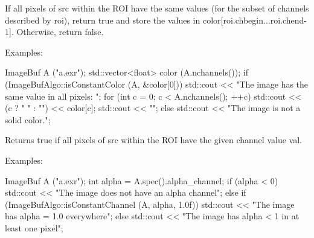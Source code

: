 \begin{comment}
 compare_Yee is a bit half-baked. Leave it out of the
  docs for now.  FIXME

\apiitem{int {\ce compare_Yee} (const ImageBuf \&A, const ImageBuf \&B, \\
  \bigspc CompareResults \&result, float luminance, float fov, \\
   \bigspc  ROI roi=ROI::All(), int nthreads=0)}
\index{ImageBufAlgo!compare_Yee} \indexapi{compare_Yee}
\apiend
\end{comment}


 

If all pixels of {\cf src} within the ROI have the same values (for the
subset of channels described by {\cf roi}), return {\cf true} and store
the values in {\cf color[roi.chbegin...roi.chend-1]}.  Otherwise, return
{\cf false}.

\smallskip
\noindent Examples:
\begin{code}
    ImageBuf A ("a.exr");
    std::vector<float> color (A.nchannels());
    if (ImageBufAlgo::isConstantColor (A, &color[0])) {
        std::cout << "The image has the same value in all pixels: ";
        for (int c = 0;  c < A.nchannels();  ++c)
            std::cout << (c ? " " : "") << color[c];
        std::cout << "\n";
    } else {
        std::cout << "The image is not a solid color.\n";
    }
\end{code}
\apiend


 

Returns {\cf true} if all pixels of {\cf src} within the ROI have the
given {\cf channel} value {\cf val}.

\smallskip
\noindent Examples:
\begin{code}
    ImageBuf A ("a.exr");
    int alpha = A.spec().alpha_channel;
    if (alpha < 0)
        std::cout << "The image does not have an alpha channel\n";
    else if (ImageBufAlgo::isConstantChannel (A, alpha, 1.0f))
        std::cout << "The image has alpha = 1.0 everywhere\n";
    else
        std::cout << "The image has alpha < 1 in at least one pixel\n";
\end{code}
\apiend

